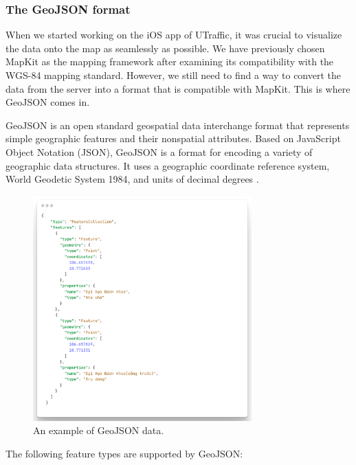 \subsubsection{The GeoJSON format}

When we started working on the iOS app of UTraffic, it was crucial to visualize the data onto the map as seamlessly as possible. We have previously chosen MapKit as the mapping framework after examining its compatibility with the WGS-84 mapping standard. However, we still need to find a way to convert the data from the server into a format that is compatible with MapKit. This is where GeoJSON comes in.


GeoJSON is an open standard geospatial data interchange format that represents simple geographic features and their nonspatial attributes. Based on JavaScript Object Notation (JSON), GeoJSON is a format for encoding a variety of geographic data structures. It uses a geographic coordinate reference system, World Geodetic System 1984, and units of decimal degrees \cite{geojsonarcgis}. 

\begin{figure}[H]
    \centering
    \includegraphics[width=0.75\textwidth]{assets/images/Research/geojson/example_geojson.png}
    \caption{An example of GeoJSON data.}
    \label{fig:geojson_example}
\end{figure}


The following feature types are supported by GeoJSON:

